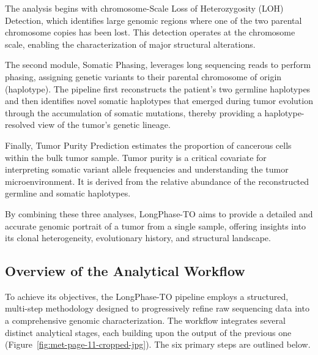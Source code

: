 \documentclass[pdflatex,sn-nature]{sn-jnl}
\begin{document}
The analysis begins with chromosome-Scale Loss of Heterozygosity (LOH) Detection, which identifies large genomic regions where one of the two parental chromosome copies has been lost. This detection operates at the chromosome scale, enabling the characterization of major structural alterations.

The second module, Somatic Phasing, leverages long sequencing reads to perform phasing, assigning genetic variants to their parental chromosome of origin (haplotype). The pipeline first reconstructs the patient's two germline haplotypes and then identifies novel somatic haplotypes that emerged during tumor evolution through the accumulation of somatic mutations, thereby providing a haplotype-resolved view of the tumor's genetic lineage.

Finally, Tumor Purity Prediction estimates the proportion of cancerous cells within the bulk tumor sample. Tumor purity is a critical covariate for interpreting somatic variant allele frequencies and understanding the tumor microenvironment. It is derived from the relative abundance of the reconstructed germline and somatic haplotypes.

By combining these three analyses, LongPhase-TO aims to provide a detailed and accurate genomic portrait of a tumor from a single sample, offering insights into its clonal heterogeneity, evolutionary history, and structural landscape.

\subsection{Overview of the Analytical Workflow}\label{overview-of-the-analytical-workflow}

To achieve its objectives, the LongPhase-TO pipeline employs a structured, multi-step methodology designed to progressively refine raw sequencing data into a comprehensive genomic characterization. The workflow integrates several distinct analytical stages, each building upon the output of the previous one (Figure~\ref{fig:met-page-11-cropped-jpg}). The six primary steps are outlined below.
\end{document}
